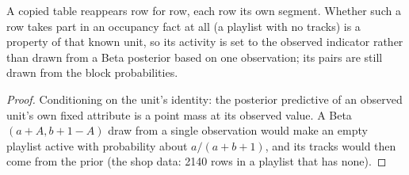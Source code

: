 \begin{proposition}\label{prop:copiedactive}
A copied table reappears row for row, each row its own segment. Whether such a row takes part in an occupancy fact at all (a playlist with no tracks) is a property of that known unit, so its activity is set to the observed indicator rather than drawn from a Beta posterior based on one observation; its pairs are still drawn from the block probabilities.
\end{proposition}
\begin{proof}
Conditioning on the unit's identity: the posterior predictive of an observed unit's own fixed attribute is a point mass at its observed value. A Beta$(a+A,b+1-A)$ draw from a single observation would make an empty playlist active with probability about $a/(a+b+1)$, and its tracks would then come from the prior (the shop data: 2140 rows in a playlist that has none).
\end{proof}


